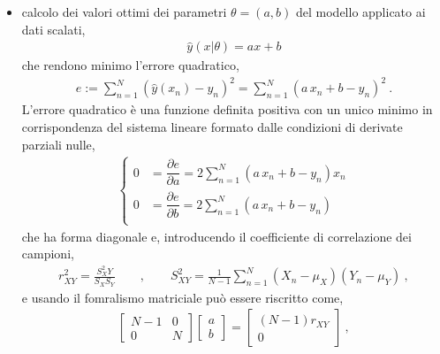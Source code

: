 \documentclass[letterpaper,10pt,italian]{jupyterBook}
\begin{document}
\begin{itemize}
\item {} 
\sphinxAtStartPar
calcolo dei valori ottimi dei parametri \(\theta = (a, b)\) del modello applicato ai dati scalati,
\begin{equation*}
\begin{split}\hat{y}(x|\theta) = a x + b\end{split}
\end{equation*}
\sphinxAtStartPar
che rendono minimo l’errore quadratico,
\begin{equation*}
\begin{split}e:= \sum_{n=1}^{N} ( \hat{y}(x_n) - y_n )^2 = \sum_{n=1}^N ( a \, x_n + b - y_n )^2 \ .\end{split}
\end{equation*}
\sphinxAtStartPar
L’errore quadratico è una funzione definita positiva con un unico minimo in corrispondenza del sistema lineare formato dalle condizioni di derivate parziali nulle,
\begin{equation*}
\begin{split}\begin{cases}
     0 & = \dfrac{\partial e}{\partial a} = 2 \sum_{n=1}^N ( a \, x_n + b - y_n ) x_n \\
     0 & = \dfrac{\partial e}{\partial b} = 2 \sum_{n=1}^N ( a \, x_n + b - y_n )     \\
   \end{cases}\end{split}
\end{equation*}
\sphinxAtStartPar
che ha forma diagonale e, introducendo il coefficiente di correlazione dei campioni,
\begin{equation*}
\begin{split}r^2_{XY} = \frac{S^2_XY}{S_X S_Y} \qquad , \qquad S^2_{XY} = \frac{1}{N-1} \sum_{n=1}^N (X_n - \mu_X)(Y_n - \mu_Y) \ ,\end{split}
\end{equation*}
\sphinxAtStartPar
e usando il fomralismo matriciale può essere riscritto come,
\begin{equation*}
\begin{split}\begin{bmatrix} N-1 & 0 \\ 0 & N \end{bmatrix} \begin{bmatrix} a \\ b \end{bmatrix} = \begin{bmatrix} (N-1) r_{XY} \\ 0 \end{bmatrix} \ ,

\end{split}
\end{equation*}
\end{itemize}
\end{document}
